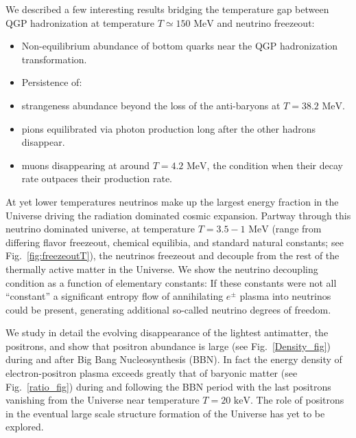 \documentclass[universe,article,submit,moreauthors,pdftex,a4paper]{Definitions/mdpi}
\newcommand{\MeV}{\text{ MeV}}
\newcommand{\keV}{\text{ keV}}
\newcommand*{\rf}[1]{Fig.~{\ref{#1}}}
\begin{document}
We described a few interesting results bridging the temperature gap between QGP hadronization at temperature $T\simeq150\MeV$ and  neutrino freezeout:
\begin{itemize}
\item Non-equilibrium abundance of bottom quarks near the QGP hadronization transformation.
\item[] Persistence of:
\item strangeness abundance beyond the loss of the anti-baryons at $T=38.2\MeV$.
\item pions equilibrated via photon production long after the other hadrons disappear.
\item muons disappearing at around $T=4.2\MeV$, the condition when their decay rate outpaces their production rate.
\end{itemize}
At yet lower temperatures neutrinos make up the largest energy fraction in the Universe driving the radiation dominated cosmic expansion. Partway through this neutrino dominated universe, at temperature $T=3.5-1\MeV$ (range from differing flavor freezeout, chemical equilibia, and standard natural constants; see \rf{fig:freezeoutT}), the neutrinos freezeout and decouple from the rest of the thermally active matter in the Universe. We show the neutrino decoupling condition as a function of elementary constants: If these constants were not all ``constant'' a significant entropy flow of annihilating $e^{\pm}$ plasma into neutrinos could be present, generating additional so-called neutrino degrees of freedom.

We study in detail the evolving disappearance of the lightest antimatter, the positrons, and show that positron abundance is large  (see \rf{Density_fig}) during and after Big Bang Nucleosynthesis (BBN). In fact the energy density of electron-positron plasma exceeds greatly that of baryonic matter (see \rf{ratio_fig}) during and following the BBN period with the last positrons vanishing from the Universe near temperature $T=20\keV$. The role of positrons in the eventual large scale structure formation of the Universe has yet to be explored.
\end{document}
